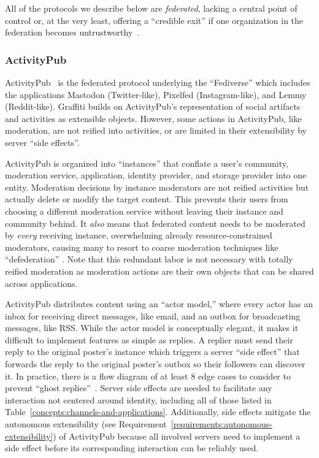 All of the protocols we describe below are \emph{federated},
lacking a central point of control or,
at the very least, offering
a ``credible exit'' if one organization in the federation becomes
untrustworthy~\cite{howdecentralizedisbluesky}.

\subsubsection{ActivityPub}
\label{related-work:activitypub}

ActivityPub~\cite{activitypub} is the federated protocol underlying the
``Fediverse'' which includes the applications
Mastodon (Twitter-like), Pixelfed (Instagram-like), and
Lemmy (Reddit-like).
Graffiti builds on ActivityPub's representation of social artifacts and
activities as extensible objects.
However, some actions in ActivityPub, like moderation, are not
reified into activities, or are
limited in their extensibility by server ``side effects''.

ActivityPub is organized into ``instances'' that conflate
a user's community, moderation service, application,
identity provider, and storage provider into one entity.
Moderation decisions by instance moderators are not reified activities
but actually delete or modify the target content.
This prevents their users from choosing a different moderation
service without leaving their instance and community
behind.
It \emph{also} means that federated content
needs to be moderated by \emph{every} receiving instance,
overwhelming already resource-constrained moderators, causing many
to resort to coarse moderation techniques like ``defederation''
\cite{securingfederatedplatforms, blocklistboundary}.
Note that this redundant labor is not necessary with totally
reified moderation as moderation actions are their own objects
that can be shared across applications.

ActivityPub distributes content using an ``actor model,''
where every actor has an inbox for receiving direct messages, like email,
and an outbox for broadcasting messages, like RSS.
While the actor model is conceptually elegant, it makes it difficult
to implement features as simple as replies.
A replier must send their reply to the original poster's instance which
triggers a server ``side effect'' that forwards the reply to the original
poster's outbox so their followers can discover it.
In practice, there is a flow diagram of at least 8 edge cases to consider
to prevent ``ghost replies''~\cite{stateofmastodon}.
Server side effects are needed to facilitate any interaction not centered around identity,
including all of those listed in Table~\ref{concepts:channels-and-applications}.
Additionally, side effects mitigate the autonomous extensibility
(see Requirement~\ref{requirements:autonomous-extensibility})
of ActivityPub
because all involved servers need to implement a side effect before
its corresponding interaction can be reliably used.

